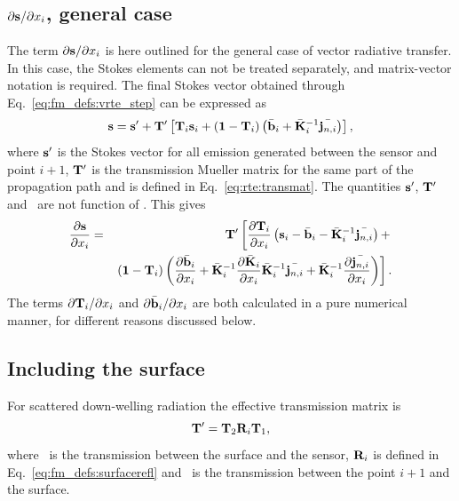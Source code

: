 \subsection{$\partial{\bf s}/\partial x_{i}$, general 
case}
\label{sec:wfuns:atmvars:gene}
%
The term $\partial{\bf s}/\partial x_{i}$ is here outlined for the general case
of vector radiative transfer. In this case, the Stokes elements can not be
treated separately, and matrix-vector notation is required. The final Stokes
vector obtained through Eq.~\ref{eq:fm_defs:vrte_step} can be expressed as
\begin{equation}
  \label{eq:s4J}
  {\bf s} = {\bf s}' + \mathbf{T}' \left[ \mathbf{T}_{i} {\bf s}_{i} +
         (\mathbf{1}-\mathbf{T}_{i}) \left(\bar{{\bf b}}_i + \bar{{\bf K}}_i^{-1}\bar{{\bf j}_{n,i}}\right) \right],
\end{equation}
where ${\bf s}'$ is the Stokes vector for all emission generated between the
sensor and point $i+1$, $\mathbf{T}'$ is the transmission Mueller matrix for the
same part of the propagation path and  is defined in
Eq.~\ref{eq:rte:transmat}. The quantities ${\bf s}'$, $\mathbf{T}'$ and
\ are not function of . This gives
\begin{eqnarray}
  \frac{\partial{\bf s}}{\partial x_{i}} &=& \mathbf{T}'
  \left[
    \frac{\partial\mathbf{T}_{i}}{\partial x_{i}}
      \left( {\bf s}_{i}-\bar{{\bf b}}_i -\bar{{\bf K}}_i^{-1}\bar{{\bf j}_{n,i}}\right)+\right. \nonumber\\ &&\left.
    \left( \mathbf{1}-\mathbf{T}_{i} \right) \left(
      \frac{\partial\bar{{\bf b}}_i}{\partial x_{i}}+\bar{{\bf K}}_i^{-1}\frac{\partial\bar{{\bf K}}_i}{\partial x_{i}}\bar{{\bf K}}_i^{-1}\bar{{\bf j}_{n,i}} + \bar{{\bf K}}_i^{-1}\frac{\partial\bar{{\bf j}_{n,i}}}{\partial x_{i}} \right)
  \right].
  \label{eq:wfuns:dsdxi1}
\end{eqnarray}
The terms $\partial\mathbf{T}_{i}/\partial x_{i}$ and
$\partial\bar{{\bf b}}_i/\partial x_{i}$ are both calculated in a pure
numerical manner, for different reasons discussed below.


\subsection{Including the surface}
%
For scattered down-welling radiation the effective transmission matrix is
\begin{equation}
  \mathbf{T}' = \mathbf{T}_{2}\mathbf{R}_i\mathbf{T}_{1},
  \label{eq:wfuns:surface}
\end{equation}
where \ is the transmission between the surface and the sensor,
$\mathbf{R}_i$ is defined in Eq.~\ref{eq:fm_defs:surfacerefl} and
\ is the transmission between the point $i+1$ and the surface.



